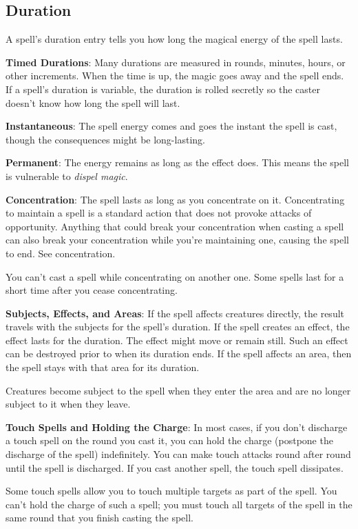 \subsection{Duration}

				
A spell's duration entry tells you how long the magical energy of the spell lasts.
				
\textbf{Timed Durations}: Many durations are measured in rounds, minutes, hours, or other increments. When the time is up, the magic goes away and the spell ends. If a spell's duration is variable, the duration is rolled secretly so the caster doesn't know how long the spell will last. 
				
\textbf{Instantaneous}: The spell energy comes and goes the instant the spell is cast, though the consequences might be long-lasting.
				
\textbf{Permanent}: The energy remains as long as the effect does. This means the spell is vulnerable to \textit{dispel magic}. 
				
\textbf{Concentration}: The spell lasts as long as you concentrate on it. Concentrating to maintain a spell is a standard action that does not provoke attacks of opportunity. Anything that could break your concentration when casting a spell can also break your concentration while you're maintaining one, causing the spell to end. See concentration.
				
You can't cast a spell while concentrating on another one. Some spells last for a short time after you cease concentrating.
				
\textbf{Subjects, Effects, and Areas}: If the spell affects creatures directly, the result travels with the subjects for the spell's duration. If the spell creates an effect, the effect lasts for the duration. The effect might move or remain still. Such an effect can be destroyed prior to when its duration ends. If the spell affects an area, then the spell stays with that area for its duration. 
				
Creatures become subject to the spell when they enter the area and are no longer subject to it when they leave.
				
\textbf{Touch Spells and Holding the Charge}: In most cases, if you don't discharge a touch spell on the round you cast it, you can hold the charge (postpone the discharge of the spell) indefinitely. You can make touch attacks round after round until the spell is discharged. If you cast another spell, the touch spell dissipates.
				
Some touch spells allow you to touch multiple targets as part of the spell. You can't hold the charge of such a spell; you must touch all targets of the spell in the same round that you finish casting the spell.
				
